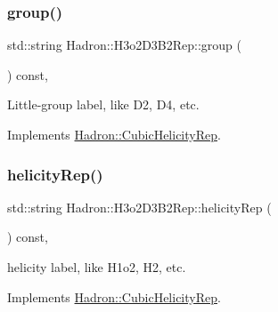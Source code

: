 \mbox{\label{structHadron_1_1H3o2D3B2Rep_a5f90a196c20d41622da336eefc77cfd1}} 
\subsubsection{\texorpdfstring{group()}{group()}\hspace{0.1cm}{\footnotesize\ttfamily [5/5]}}
{\footnotesize\ttfamily std\+::string Hadron\+::\+H3o2\+D3\+B2\+Rep\+::group (\begin{DoxyParamCaption}{ }\end{DoxyParamCaption}) const\hspace{0.3cm}{\ttfamily [inline]}, {\ttfamily [virtual]}}

Little-\/group label, like D2, D4, etc. 

Implements \mbox{\hyperlink{structHadron_1_1CubicHelicityRep_a101a7d76cd8ccdad0f272db44b766113}{Hadron\+::\+Cubic\+Helicity\+Rep}}.

\mbox{\label{structHadron_1_1H3o2D3B2Rep_aba53f298e71b3e22d5828f164c2127cc}} 
\subsubsection{\texorpdfstring{helicityRep()}{helicityRep()}\hspace{0.1cm}{\footnotesize\ttfamily [1/3]}}
{\footnotesize\ttfamily std\+::string Hadron\+::\+H3o2\+D3\+B2\+Rep\+::helicity\+Rep (\begin{DoxyParamCaption}{ }\end{DoxyParamCaption}) const\hspace{0.3cm}{\ttfamily [inline]}, {\ttfamily [virtual]}}

helicity label, like H1o2, H2, etc. 

Implements \mbox{\hyperlink{structHadron_1_1CubicHelicityRep_af1096946b7470edf0a55451cc662f231}{Hadron\+::\+Cubic\+Helicity\+Rep}}.

\mbox{\label{structHadron_1_1H3o2D3B2Rep_aba53f298e71b3e22d5828f164c2127cc}} 
